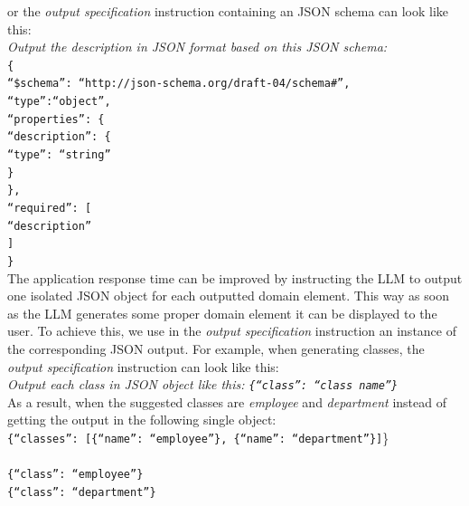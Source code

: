 \noindent{}or the \emph{output specification} instruction containing an JSON schema can look like this: \\

\noindent{}\textit{Output the description in JSON format based on this JSON schema:} \\
\texttt{\frenchspacing\{ \\
\null \quad ``\$schema'': ``http://json-schema.org/draft-04/schema\#'', \\
\null \quad  ``type'':``object'', \\
\null \quad  ``properties'': \{ \\
\null \quad \quad ``description'': \{ \\
\null \quad \quad \quad ``type'': ``string'' \\
\null \quad \quad   \} \\
\null \quad  \}, \\
\null \quad  ``required'': [ \\
\null \quad \quad   ``description'' \\
\null \quad  ] \\
\}} \\


The application response time can be improved by instructing the LLM to output one isolated JSON object for each outputted domain element. This way as soon as the LLM generates some proper domain element it can be displayed to the user. To achieve this, we use in the \emph{output specification} instruction an instance of the corresponding JSON output. For example, when generating classes, the \emph{output specification} instruction can look like this: \\

\noindent{}\textit{Output each class in JSON object like this: \texttt{\frenchspacing\{``class'': ``class name''\}}} \\

\noindent{}As a result, when the suggested classes are \textit{employee} and \textit{department} instead of getting the output in the following single object: \\

\noindent{}\texttt{\frenchspacing\{``classes'': [\{``name'': ``employee''\}, \{``name'': ``department''\}]}\} \\

 \\

\noindent{}\texttt{\frenchspacing\{``class'': ``employee''\} \\
\{``class'': ``department''\}}


